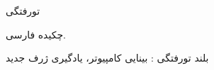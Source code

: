

\vspace*{-60pt}
\enlargethispage{90pt}


\vspace{-1cm}

‌تورفتگی

چکیده فارسی.


‌بلند
‌تورفتگی : 
بینایی کامپیوتر، یادگیری ژرف 
‌جدید
